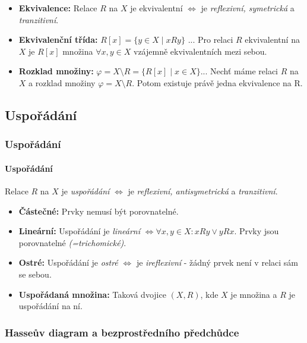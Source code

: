 \documentclass[10pt,a4paper]{article}
\begin{document}
\begin{itemize}
    \item \textbf{Ekvivalence:} Relace $R$ na $X$ je ekvivalentní $\iff$ je \textit{reflexivní, symetrická} a \textit{tranzitivní}.
    \item \textbf{Ekvivalenční třída:} $R[x] = \{y \in X \mid xRy\}$ ... Pro relaci $R$ ekvivalentní na $X$ je $R[x]$ množina $\forall x,y\in X$ vzájemně ekvivalentních mezi sebou.
    \item \textbf{Rozklad množiny:} $\varphi = X\setminus R = \{R[x] \mid x\in X\}$... Nechť máme relaci $R$ na $X$ a rozklad množiny $\varphi = X\setminus R$. Potom existuje právě jedna ekvivalence na R.
\end{itemize}

\subsection{Uspořádání}

\subsubsection{Uspořádání}

\paragraph*{Uspořádání} Relace $R$ na $X$ je \textit{uspořádání} $\iff$ je \textit{reflexivní, antisymetrická} a \textit{tranzitivní}.

\begin{itemize}
    \item \textbf{Částečné:} Prvky nemusí být porovnatelné.
    \item \textbf{Lineární:} Uspořádání je \textit{lineární} $\iff \forall x,y \in X: xRy \lor yRx$. Prvky jsou porovnatelné \textit{(=trichomické)}.
    \item \textbf{Ostré:} Uspořádání je \textit{ostré} $\iff$ je \textit{ireflexivní} - žádný prvek není v relaci sám se sebou.
    \item \textbf{Uspořádaná množina:} Taková dvojice $(X, R)$, kde $X$ je množina a $R$ je uspořádání na ní.
\end{itemize}

\subsubsection{Hasseův diagram a bezprostředního předchůdce}
\end{document}

